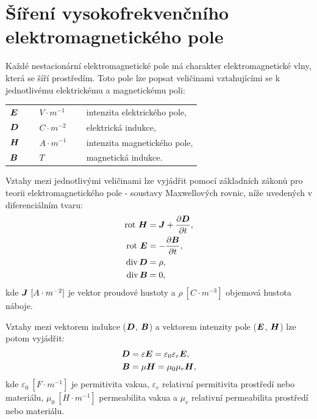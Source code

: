 \documentclass[12pt,a4paper,oneside]{article}
\numberwithin{equation}{section} %
\numberwithin{figure}{section} %
\numberwithin{table}{section} %
\renewcommand{\vec}[1]{\mbox{\boldmath$#1$}} %
\newcommand{\rot}{\mathrm{rot}\ }
\begin{document}
\newpage

\section{Šíření vysokofrekvenčního elektromagnetického pole}
Každé nestacionární elektromagnetické pole má charakter elektromagnetické vlny, která se šíří prostředím. Toto pole lze popsat veličinami vztahujícími se k jednotlivému elektrickému a magnetickému poli:
\begin{table}[h] %
\begin{center} %
\begin{tabular}{l l l}
$\vec{E}$~~~ & $V \cdot m^{-1}$~~~ & intenzita elektrického pole, \\ 
$\vec{D}$ & $C \cdot m^{-2}$ & elektrická indukce, \\ 
$\vec{H}$ & $A \cdot m^{-1}$ & intenzita magnetického pole, \\ 
$\vec{B}$ & $T$ & magnetická indukce. \\ 
\end{tabular} 
\end{center}
\end{table}

Vztahy mezi jednotlivými veličinami lze vyjádřit pomocí základních zákonů pro teorii elektromagnetického pole - soustavy Maxwellových rovnic, níže uvedených v diferenciálním tvaru:
\begin{subequations}
\begin{align}
\label{maxdif1}
\rot \vec{H} &= \vec{J} + \frac{\partial \vec{D}}{\partial t},
\\
\label{maxdif2}
\rot \vec{E} &= - \frac{\partial \vec{B}}{\partial t},
\\
\label{maxdif3}
\udiv \vec{D} &= \rho,
\\
\label{maxdif4}
\udiv \vec{B} &= 0,
\end{align}
\end{subequations}
kde $\vec{J} ~[A \cdot m^{-2}]$ je vektor proudové hustoty a $\rho ~[C \cdot m^{-3}]$ objemová hustota náboje. 

Vztahy mezi vektorem indukce ($\vec{D}$, $\vec{B}$) a vektorem intenzity pole ($\vec{E}$, $\vec{H}$) lze potom vyjádřit:
\begin{subequations}
\begin{align}
\label{epsilonE}
\vec{D} &= \varepsilon \vec{E} = \varepsilon _0 \varepsilon _r \vec{E},
\\
\label{muH}
\vec{B} &= \mu \vec{H} = \mu _0 \mu _r \vec{H},
\end{align}
\end{subequations}
kde $\varepsilon _0 ~[F \cdot m^{-1}]$ je permitivita vakua, $\varepsilon _r$ relativní permitivita prostředí nebo materiálu, $\mu _0 ~[H \cdot m^{-1}]$ permeabilita vakua a $\mu _r$ relativní permeabilita prostředí nebo materiálu.
\end{document}
